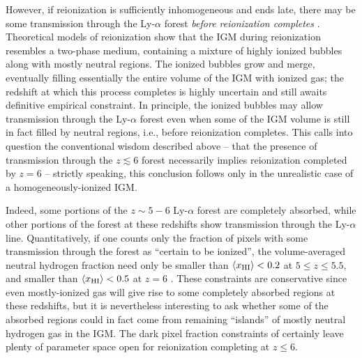 However, if reionization is sufficiently inhomogeneous and ends late, there may be some transmission through
the Ly-$\alpha$ forest {\em before reionization completes} \citep{Mesinger:2009mv,Lidz:2007mz}. Theoretical models of reionization show that
the IGM during reionization resembles a two-phase medium, containing a mixture of highly ionized
bubbles along with mostly neutral regions. The ionized bubbles grow and merge, eventually filling essentially the entire
volume of the IGM with ionized gas; the redshift at which this process completes is highly uncertain and still awaits definitive empirical constraint. In principle, the ionized bubbles may allow transmission through the
Ly-$\alpha$ forest even when some of the IGM volume is still in fact filled by neutral regions, i.e., before reionization completes.
This calls into question the conventional wisdom described above -- that the presence of transmission through the $z \lesssim 6$ forest
necessarily implies reionization completed by $z=6$ \citep{Lidz:2007mz,Mesinger:2009mv} -- strictly speaking, this conclusion follows only in 
the unrealistic case of a homogeneously-ionized
IGM. 

Indeed, some portions of the $z \sim 5-6$ Ly-$\alpha$ forest are completely absorbed, while other portions of the forest at these redshifts show
transmission through the Ly-$\alpha$ line. 
Quantitatively, if one counts only the fraction of pixels with some transmission
through the forest as ``certain to be ionized'', the volume-averaged neutral hydrogen fraction need only be smaller than 
$\langle x_{\rm HI} \rangle < 0.2$ at $5 \leq z \leq 5.5$, and smaller than $\langle x_{\rm HI} \rangle < 0.5$ at $z=6$ \citep{McGreer:2011dm}.
These constraints are conservative since even mostly-ionized gas will give rise to some completely absorbed regions at these redshifts, 
but it is nevertheless interesting to ask whether some of the absorbed regions could in fact
come from remaining ``islands'' of mostly neutral hydrogen gas in the IGM. The dark pixel fraction constraints of \citet{McGreer:2011dm} certainly leave
plenty of parameter space open for reionization completing at $z \leq 6$. 

